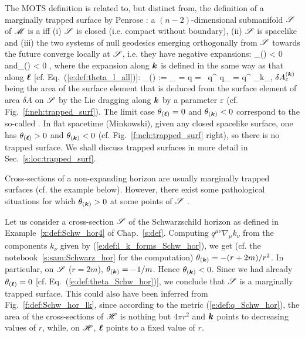 The MOTS definition is related to, but distinct from, the definition of a
marginally trapped surface by Penrose \cite{Penro65}: a $(n-2)$-dimensional
submanifold $\mathscr{S}$ of $\mathscr{M}$ is a 
 iff (i) $\mathscr{S}$ is
closed (i.e. compact without boundary), (ii) $\mathscr{S}$ is spacelike and (iii)
the two systems of null geodesics emerging orthogonally from $\mathscr{S}$ towards the future
converge locally at $\mathscr{S}$, i.e. they have negative expansions:
\be \label{e:neh:def_trapped_surf}
    \theta_{(\wl)} < 0 \quad\mbox{and}\quad \theta_{()} < 0 ,
\ee
where the expansion along $\bm{k}$ is defined in the same way as that along
$\bm{\ell}$ [cf. Eq.~(\ref{e:def:theta_l_all})]:
\be \label{e:neh:expansion_k}
    \theta_{()} := \lim_{\varepsilon{}} 
        =   \ln q
        =  \, q^{\mu\nu}  q_{\mu\nu}
        = q^{\mu\nu} \nabla_\mu k_\nu ,
\ee
$\delta A^{(\bm{k})}_\varepsilon$ being the area of the surface element
that is deduced from the surface element of area $\delta A$ on $\mathscr{S}$ by the
Lie dragging along $\bm{k}$ by a parameter $\varepsilon$ (cf. Fig.~\ref{f:neh:trapped_surf}).
The limit case $\theta_{(\bm{\ell})} = 0$ and $\theta_{(\bm{k})}<0$ correspond
to the so-called .
In flat spacetime (Minkowski), given any closed spacelike surface,
one has $\theta_{(\bm{\ell})} > 0$ and $\theta_{(\bm{k})} < 0$ (cf. Fig.~\ref{f:neh:trapped_surf} right), so there is no trapped surface. We shall discuss trapped surfaces in more
detail in Sec.~\ref{s:loc:trapped_surf}.

Cross-sections of a non-expanding horizon are usually marginally trapped surfaces
(cf. the example below).
However, there exist some pathological situations for
which $\theta_{(\bm{k})} > 0$ at some points of $\mathscr{S}$ \cite{GerocH82}.

\begin{example}
Let us consider a cross-section $\mathscr{S}$ of the Schwarzschild horizon as
defined in Example~\ref{x:def:Schw_hor4} of Chap.~\ref{s:def}.
Computing $q^{\mu\nu} \nabla_\mu k_\nu$ from the components $k_\nu$
given by (\ref{e:def:l_k_forms_Schw_hor}), we get (cf. the notebook~\ref{s:sam:Schwarz_hor} for
the computation) $\theta_{(\bm{k})} = - (r+2m)/r^2$.
In particular, on $\mathscr{S}$ ($r=2m$), $\theta_{(\bm{k})}  = - 1/m$.
Hence $\theta_{(\bm{k})} < 0$. Since we had already $\theta_{(\bm{\ell})}=0$
[cf. Eq.~(\ref{e:def:theta_Schw_hor})], we conclude that $\mathscr{S}$ is a
marginally trapped surface. This could also have been inferred from
Fig.~\ref{f:def:Schw_hor_lk}, since according to the metric
(\ref{e:def:q_Schw_hor}), the area of the cross-sections of $\mathscr{H}$
is nothing but $4\pi r^2$ and $\bm{k}$ points to decreasing values of $r$, while, on $\mathscr{H}$,
$\bm{\ell}$ points to a fixed value of $r$.
\end{example}

